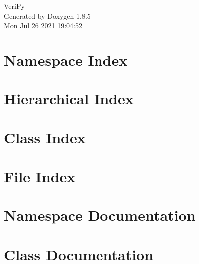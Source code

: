 \documentclass[twoside]{book}
\newcommand{\clearemptydoublepage}{%
  \newpage{\pagestyle{empty}\cleardoublepage}%
}
\begin{document}
\hypersetup{pageanchor=false}
\begin{titlepage}
\vspace*{7cm}
\begin{center}%
{\Large Veri\-Py }\\
\vspace*{1cm}
{\large Generated by Doxygen 1.8.5}\\
\vspace*{0.5cm}
{\small Mon Jul 26 2021 19:04:52}\\
\end{center}
\end{titlepage}
\clearemptydoublepage
\tableofcontents
\clearemptydoublepage
{}
\hypersetup{pageanchor=true}

\chapter{Namespace Index}

\chapter{Hierarchical Index}

\chapter{Class Index}

\chapter{File Index}

\chapter{Namespace Documentation}












\chapter{Class Documentation}













\end{document}
